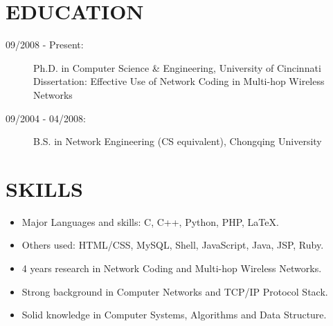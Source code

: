 \documentclass[line]{res}
\begin{document}
\address{226 Ludlow Ave Apt 11 \\ Cincinnati, OH 45220 \\ \href{mailto:yang@yangchi.me}{yang@yangchi.me} \\ Github: \url{https://github.com/yangchi} }

\begin{resume}
	\section{EDUCATION}
	\begin{description}
		\item[09/2008 - Present:] Ph.D. in Computer Science \& Engineering, University of Cincinnati\\
			Dissertation: Effective Use of Network Coding in Multi-hop Wireless Networks
		\item[09/2004 - 04/2008:] B.S. in Network Engineering (CS equivalent), Chongqing University
	\end{description}
	
	\section{SKILLS}
	\begin{itemize}
		\item Major Languages and skills: C, C++, Python, PHP, LaTeX.
		\item Others used: HTML/CSS, MySQL, Shell, JavaScript, Java, JSP, Ruby.
		\item 4 years research in Network Coding and Multi-hop Wireless Networks.
		\item Strong background in Computer Networks and TCP/IP Protocol Stack.
		\item Solid knowledge in Computer Systems, Algorithms and Data Structure.
	\end{itemize}


\end{resume}
\end{document}
